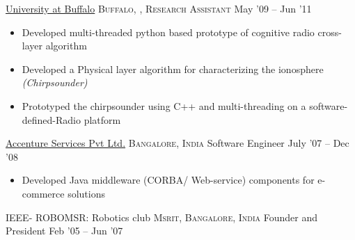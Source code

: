 \documentclass[10pt,a4paper]{article} %
\begin{document}
\headedsection %
{\href{http://www.ece.neu.edu/wineslab/}{University at Buffalo}}
{\textsc{Buffalo, , }} {}
  \headedsubsection %
  {\textsc{Research Assistant}} {May '09 -- Jun '11} {}
	\bodytext
	{
	  \begin{itemize}
		\item Developed multi-threaded python based prototype of cognitive radio cross-layer algorithm
		\item Developed a Physical layer algorithm for characterizing the ionosphere \textit{(Chirpsounder)}
		\item Prototyped the chirpsounder using C++ and multi-threading on a software-defined-Radio platform
	  \end{itemize}
	}


\headedsection %
{\href{http://www.accenture.com/}{Accenture Services Pvt Ltd.}}
{\textsc{Bangalore, India}} {}
  \headedsubsection %
  {Software Engineer} {July '07 -- Dec '08} {}
	\bodytext
	{
	  \begin{itemize}
		\item Developed Java middleware (CORBA/ Web-service) components for e-commerce solutions
	  \end{itemize}
	}

\headedsection %
{IEEE- ROBOMSR: Robotics club}
{\textsc{Msrit, Bangalore, India}} {}
  \headedsubsection %
  {Founder and President} {Feb '05 -- Jun '07} {}
  
\end{document}
